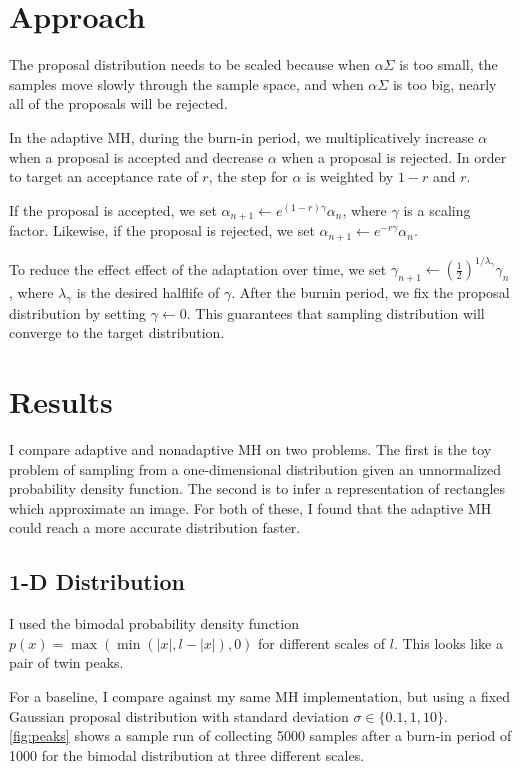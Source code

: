 \documentclass[11pt]{article}
\begin{document}
\section{Approach}
The proposal distribution needs to be scaled because when $\alpha\Sigma$ is too small, the samples move slowly through the sample space, and when $\alpha\Sigma$ is too big, nearly all of the proposals will be rejected.

In the adaptive MH, during the burn-in period, we multiplicatively increase $\alpha$ when a proposal is accepted and decrease $\alpha$ when a proposal is rejected. In order to target an acceptance rate of $r$, the step for $\alpha$ is weighted by $1-r$ and $r$.

If the proposal is accepted, we set $\alpha_{n+1}\leftarrow e^{(1-r)\gamma}\alpha_n$, where $\gamma$ is a scaling factor. Likewise, if the proposal is rejected, we set $\alpha_{n+1}\leftarrow e^{-r\gamma}\alpha_n$.

To reduce the effect effect of the adaptation over time, we set $\gamma_{n+1}\leftarrow \left(\frac12\right)^{1/\lambda_\gamma}\gamma_n$, where $\lambda_\gamma$ is the desired halflife of $\gamma$. After the burnin period, we fix the proposal distribution by setting $\gamma\leftarrow0$. This guarantees that sampling distribution will converge to the target distribution.

\section{Results}

I compare adaptive and nonadaptive MH on two problems. The first is the toy problem of sampling from a one-dimensional distribution given an unnormalized probability density function. The second is to infer a representation of rectangles which approximate an image. For both of these, I found that the adaptive MH could reach a more accurate distribution faster.

\subsection{1-D Distribution}
I used the bimodal probability density function $p(x)=\max(\min(|x|,l-|x|),0)$ for different scales of $l$. This looks like a pair of twin peaks.

For a baseline, I compare against my same MH implementation, but using a fixed Gaussian proposal distribution with standard deviation $\sigma\in\{0.1,1,10\}$. \cref{fig:peaks} shows a sample run of collecting 5000 samples after a burn-in period of 1000 for the bimodal distribution at three different scales.
\end{document}
